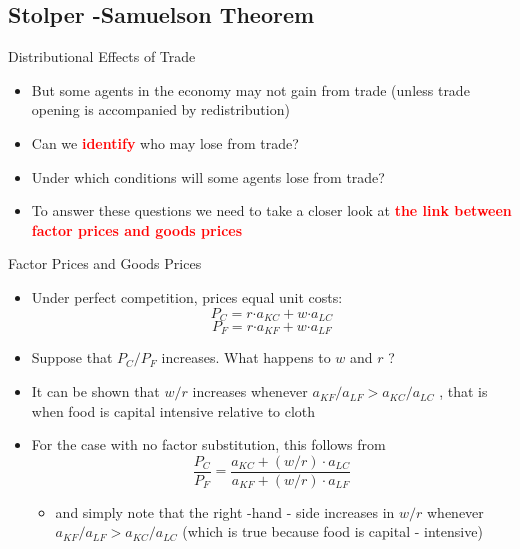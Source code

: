 \documentclass[10pt,hyperref={CJKbookmarks=true},xcolor=dvipsnames,aspectratio=169]{beamer}
\begin{document}
\subsection{Stolper -Samuelson Theorem}
\begin{frame}{Distributional Effects of Trade }

\begin{itemize}
\item But some agents in the economy may not gain from trade (unless trade
opening is accompanied by redistribution) 
\item Can we \textbf{\textcolor{red}{identify}} who may lose from trade? 
\item Under which conditions will some agents lose from trade?
\item To answer these questions we need to take a closer look at \textbf{\textcolor{red}{the
link between factor prices and goods prices}} 
\end{itemize}
\end{frame}

\begin{frame}{Factor Prices and Goods Prices }

\begin{itemize}
\item Under perfect competition, prices equal unit costs: 
\[
P_{C}=r\text{·}a_{KC}+w\text{·}a_{LC}
\]
\[
P_{F}=r\text{·}a_{KF}+w\text{·}a_{LF}
\]
 
\item Suppose that $P_{C}/P_{F}$ increases. What happens to $w$ and $r$
? 
\item It can be shown that $w/r$ increases whenever $a_{KF}/a_{LF}>a_{KC}/a_{LC}$
, that is when food is capital intensive relative to cloth 
\item For the case with no factor substitution, this follows from 
\[
\frac{P_{C}}{P_{F}}=\frac{a_{KC}+\left(w/r\right)\cdot a_{LC}}{a_{KF}+\left(w/r\right)\cdot a_{LF}}
\]


\begin{itemize}
\item and simply note that the right -hand - side increases in $w/r$ whenever
$a_{KF}/a_{LF}>a_{KC}/a_{LC}$ (which is true because food is capital
- intensive) 
\end{itemize}
\end{itemize}
\end{frame}
\end{document}
